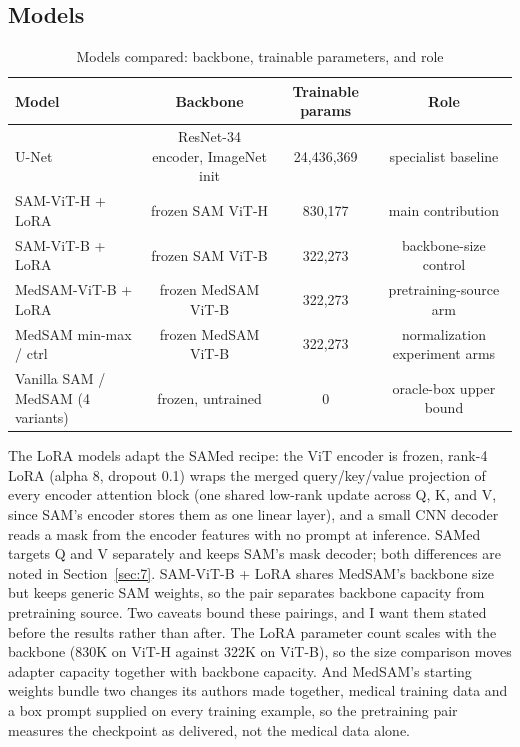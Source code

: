 \documentclass[conference]{IEEEtran}
\begin{document}
\subsection{Models}\label{sec:4.2}
\begin{table}[t]
\centering
\footnotesize
\caption{Models compared: backbone, trainable parameters, and role}
\label{tab:2}
\begin{tabular}{lccc}
\hline
\textbf{Model} & \textbf{Backbone} & \textbf{Trainable params} & \textbf{Role} \\
\hline
U-Net & ResNet-34 encoder, ImageNet init \cite{ref21,ref22} & 24,436,369 & specialist baseline \\
SAM-ViT-H + LoRA & frozen SAM ViT-H & 830,177 & main contribution \\
SAM-ViT-B + LoRA & frozen SAM ViT-B & 322,273 & backbone-size control \\
MedSAM-ViT-B + LoRA & frozen MedSAM ViT-B & 322,273 & pretraining-source arm \\
MedSAM min-max / ctrl & frozen MedSAM ViT-B & 322,273 & normalization experiment arms \\
Vanilla SAM / MedSAM (4 variants) & frozen, untrained & 0 & oracle-box upper bound \\
\hline
\end{tabular}
\end{table}

The LoRA models adapt the SAMed recipe: the ViT encoder is frozen, rank-4 LoRA (alpha 8, dropout 0.1) wraps the merged query/key/value projection of every encoder attention block (one shared low-rank update across Q, K, and V, since SAM's encoder stores them as one linear layer), and a small CNN decoder reads a mask from the encoder features with no prompt at inference. SAMed targets Q and V separately and keeps SAM's mask decoder; both differences are noted in Section~\ref{sec:7}. SAM-ViT-B + LoRA shares MedSAM's backbone size but keeps generic SAM weights, so the pair separates backbone capacity from pretraining source. Two caveats bound these pairings, and I want them stated before the results rather than after. The LoRA parameter count scales with the backbone (830K on ViT-H against 322K on ViT-B), so the size comparison moves adapter capacity together with backbone capacity. And MedSAM's starting weights bundle two changes its authors made together, medical training data and a box prompt supplied on every training example, so the pretraining pair measures the checkpoint as delivered, not the medical data alone.
\end{document}
